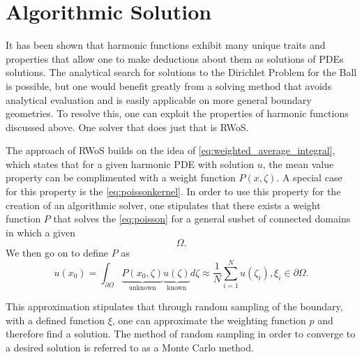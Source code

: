 \section{Algorithmic Solution}
It has been shown that harmonic functions exhibit many unique traits and properties
that allow one to make deductions about them as solutions of \glspl{PDE} solutions.  The analytical search for solutions to
the Dirichlet Problem for the Ball is possible, but one would benefit greatly
from a solving method that avoids analytical evaluation and is easily applicable on more
general boundary geometries.  To resolve this, one can exploit the properties
of harmonic functions discussed above.  One solver that does just that is \Gls{RWoS}.
\par
The approach of \gls{RWoS} builds on the idea of \ref{eq:weighted_average_integral},
which states that for a given harmonic \gls{PDE} with solution $u$, the mean value
property can be complimented with a weight function $P(x,\zeta)$.  A special case
for this property is the \ref{eq:poissonkernel}.    In order to
use this property for the creation of an algorithmic solver, one stipulates
that there exists a weight function $P$ that solves the \ref{eq:poisson} for a general susbet of connected domains
in which a given $$\Omega.$$ We then go on to define $P$ as
\begin{equation}
  u(x_{0})= \int_{\partial \Omega} \underbrace{P(x_{0},\zeta)}_\text{unknown} \underbrace{u(\zeta)}_\text{known} d\zeta \approx \frac{1}{N} \sum_{i=1}^{N} u(\zeta_{i}), \xi_{i} \in \partial \Omega.
\end{equation}

This approximation stipulates that through random sampling of the boundary, with
a defined function $\xi$, one can approximate the weighting function $p$ and therefore
find a solution.  The method of random sampling in order to converge to a desired solution
is referred to as a Monte Carlo method.
\par


